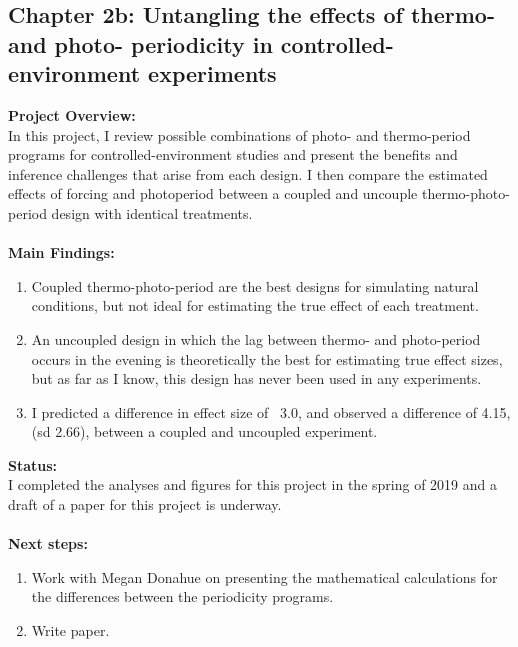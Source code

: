 \documentclass[11pt]{article}\usepackage[]{graphicx}\usepackage[]{color}
\begin{document}
\subsection*{Chapter 2b: Untangling the effects of thermo- and photo- periodicity in controlled-environment experiments}
 \textbf{Project Overview:}\\
\indent In this project, I review possible combinations of photo- and thermo-period programs for controlled-environment studies and present the benefits and inference challenges that arise from each design. I then compare the estimated effects of forcing and photoperiod between a coupled and uncouple thermo-photo-period design with identical treatments.\\
\\
\textbf{Main Findings:}
\begin{enumerate}
\item Coupled thermo-photo-period are the best designs for simulating natural conditions, but not ideal for estimating the true effect of each treatment.
\item An uncoupled design in which the lag between thermo- and photo-period occurs in the evening is theoretically the best for estimating true effect sizes, but as far as I know, this design has never been used in any experiments.
\item I predicted a difference in effect size of ~3.0, and observed a difference of 4.15, (sd 2.66), between a coupled and uncoupled experiment.
\end{enumerate}
\textbf{Status:}\\ \indent I completed the analyses and figures for this project in the spring of 2019 and a draft of a paper for this project is underway.\\
\\
\textbf{Next steps:}
\begin{enumerate}
\item Work with Megan Donahue on presenting the mathematical calculations for the differences between the periodicity programs.
\item Write paper.
\end{enumerate}
\end{document}
